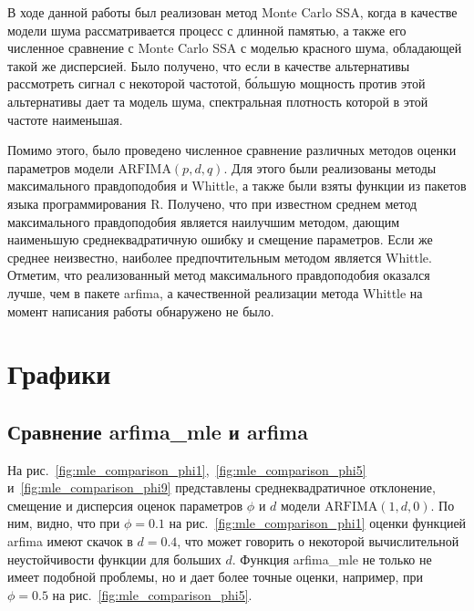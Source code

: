 \documentclass[specialist,
substylefile = spbu_report.rtx,
subf,href,colorlinks=true, 12pt]{disser}
\theoremstyle{definition}
\begin{document}
\conclusion
В ходе данной работы был реализован метод Monte Carlo SSA, когда в качестве модели шума рассматривается процесс с длинной памятью, а также его численное сравнение с Monte Carlo SSA с моделью красного шума, обладающей такой же дисперсией. Было получено, что если в качестве альтернативы рассмотреть сигнал с некоторой частотой, б\'{о}льшую мощность против этой альтернативы дает та модель шума, спектральная плотность которой в этой частоте наименьшая.

Помимо этого, было проведено численное сравнение различных методов оценки параметров модели $\mathrm{ARFIMA}(p, d, q)$. Для этого были реализованы методы максимального правдоподобия и Whittle, а также были взяты функции из пакетов языка программирования \textsf{R}. Получено, что при известном среднем метод максимального правдоподобия является наилучшим методом, дающим наименьшую среднеквадратичную ошибку и смещение параметров. Если же среднее неизвестно, наиболее предпочтительным методом является Whittle. Отметим, что реализованный метод максимального правдоподобия оказался лучше, чем в пакете \textsf{arfima}, а качественной реализации метода Whittle на момент написания работы обнаружено не было.




\appendix
\chapter{Графики}
\section{Сравнение \textsf{arfima\_mle} и \textsf{arfima}}\label{sect:mle_comparison}
На рис.~\ref{fig:mle_comparison_phi1},~\ref{fig:mle_comparison_phi5} и~\ref{fig:mle_comparison_phi9} представлены среднеквадратичное отклонение, смещение и дисперсия оценок параметров $\phi$ и $d$ модели $\mathrm{ARFIMA}(1, d, 0)$. По ним, видно, что при $\phi=0.1$ на рис.~\ref{fig:mle_comparison_phi1} оценки функцией \textsf{arfima} имеют скачок в $d=0.4$, что может говорить о некоторой вычислительной неустойчивости функции для больших $d$. Функция \textsf{arfima\_mle} не только не имеет подобной проблемы, но и дает более точные оценки, например, при $\phi=0.5$ на рис.~\ref{fig:mle_comparison_phi5}.
\end{document}
